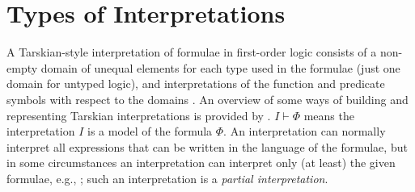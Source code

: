\documentclass{easychair}
\begin{document}
\section{Types of Interpretations}
\label{TypesOfInterpretations}

A Tarskian-style interpretation \cite{TV56} of formulae in first-order logic consists of a 
non-empty domain of unequal elements for each type used in the formulae (just one domain for 
untyped logic), and interpretations of the function and predicate symbols with respect to the 
domains \cite{Hun96,Gal15}.
An overview of some ways of building and representing Tarskian interpretations is provided 
by \cite{CLP04}.
$I \vdash \Phi$ means the interpretation $I$ is a model of the formula $\Phi$.
An interpretation can normally interpret all expressions that can be written in the language of 
the formulae, but in some circumstances an interpretation can interpret only (at least) the given 
formulae, e.g., \cite{BSW23}; such an interpretation is a {\em partial interpretation}.
\end{document}
